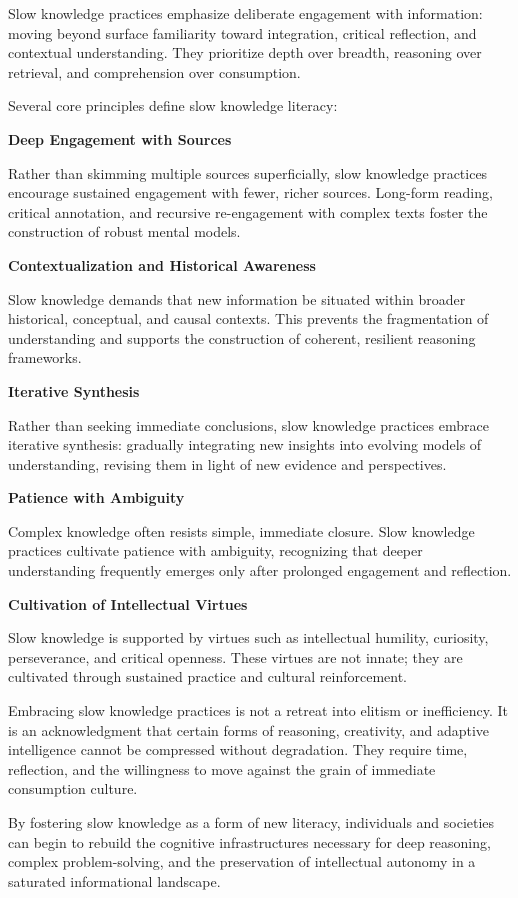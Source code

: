 Slow knowledge practices emphasize deliberate engagement with
information: moving beyond surface familiarity toward integration,
critical reflection, and contextual understanding. They prioritize depth
over breadth, reasoning over retrieval, and comprehension over
consumption.

Several core principles define slow knowledge literacy:

\textbf{Deep Engagement with Sources}

Rather than skimming multiple sources superficially, slow knowledge
practices encourage sustained engagement with fewer, richer sources.
Long-form reading, critical annotation, and recursive re-engagement with
complex texts foster the construction of robust mental models.

\textbf{Contextualization and Historical Awareness}

Slow knowledge demands that new information be situated within broader
historical, conceptual, and causal contexts. This prevents the
fragmentation of understanding and supports the construction of
coherent, resilient reasoning frameworks.

\textbf{Iterative Synthesis}

Rather than seeking immediate conclusions, slow knowledge practices
embrace iterative synthesis: gradually integrating new insights into
evolving models of understanding, revising them in light of new evidence
and perspectives.

\textbf{Patience with Ambiguity}

Complex knowledge often resists simple, immediate closure. Slow
knowledge practices cultivate patience with ambiguity, recognizing that
deeper understanding frequently emerges only after prolonged engagement
and reflection.

\textbf{Cultivation of Intellectual Virtues}

Slow knowledge is supported by virtues such as intellectual humility,
curiosity, perseverance, and critical openness. These virtues are not
innate; they are cultivated through sustained practice and cultural
reinforcement.

Embracing slow knowledge practices is not a retreat into elitism or
inefficiency. It is an acknowledgment that certain forms of reasoning,
creativity, and adaptive intelligence cannot be compressed without
degradation. They require time, reflection, and the willingness to move
against the grain of immediate consumption culture.

By fostering slow knowledge as a form of new literacy, individuals and
societies can begin to rebuild the cognitive infrastructures necessary
for deep reasoning, complex problem-solving, and the preservation of
intellectual autonomy in a saturated informational landscape.



